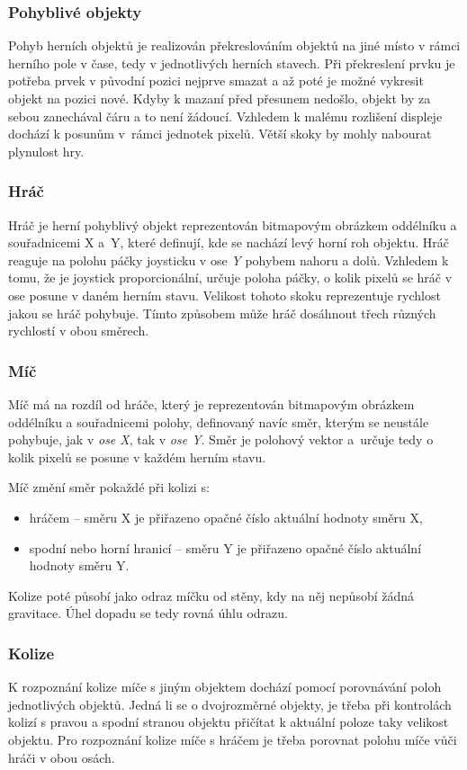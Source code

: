 \documentclass[a4paper, 11pt]{article}
\begin{document}
\subsubsection{Pohyblivé objekty}
Pohyb herních objektů je realizován překreslováním objektů na jiné místo v rámci herního pole v čase, tedy v jednotlivých herních stavech. Při překreslení
prvku je potřeba prvek v původní pozici nejprve smazat a až poté je možné vykresit objekt na pozici nové. Kdyby k mazaní před přesunem nedošlo, objekt by za
sebou zanechával čáru a to není žádoucí. Vzhledem k malému rozlišení displeje dochází k posunům v~rámci jednotek pixelů. Větší skoky by mohly nabourat plynulost hry.

\subsubsection{Hráč}
Hráč je herní pohyblivý objekt reprezentován bitmapovým obrázkem oddélníku a souřadnicemi X a~Y, které definují, kde se nachází levý horní roh objektu.
Hráč reaguje na polohu páčky joysticku v ose \emph{Y} pohybem nahoru a dolů. Vzhledem k tomu, že je joystick proporcionální, určuje poloha páčky, o kolik pixelů se hráč
v ose posune v daném herním stavu. Velikost tohoto skoku reprezentuje rychlost jakou se hráč pohybuje. Tímto způsobem může hráč dosáhnout třech různých rychlostí
v obou směrech.

\subsubsection{Míč}
Míč má na rozdíl od hráče, který je reprezentován bitmapovým obrázkem oddélníku a souřadnicemi polohy, definovaný navíc směr, kterým se neustále pohybuje, jak v \emph{ose X}, tak
v \emph{ose Y}. Směr je polohový vektor a~určuje tedy o kolik pixelů se posune v každém herním stavu.

Míč změní směr pokaždé při kolizi s:
\begin{itemize}
    \item {hráčem -- směru X je přiřazeno opačné číslo aktuální hodnoty směru X,}
    \item {spodní nebo horní hranicí -- směru Y je přiřazeno opačné číslo aktuální hodnoty směru Y.}
\end{itemize}
Kolize poté působí jako odraz míčku od stěny, kdy na něj nepůsobí žádná gravitace. Úhel dopadu se tedy rovná úhlu odrazu.

\subsubsection{Kolize}
K rozpoznání kolize míče s jiným objektem dochází pomocí porovnávání poloh jednotlivých objektů. Jedná li se o dvojrozměrné objekty, je třeba při kontrolách kolizí
s pravou a spodní stranou objektu přičítat k aktuální poloze taky velikost objektu. Pro rozpoznání kolize míče s hráčem je třeba porovnat polohu míče vůči hráči v obou
osách.
\end{document}
